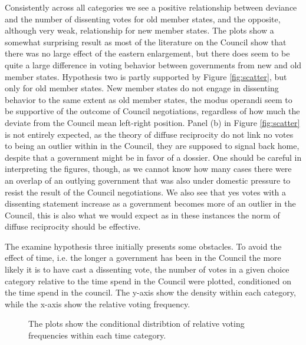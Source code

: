 Consistently across all categories we see a positive relationship between deviance and the number of dissenting votes for old member states, and the opposite, although very weak, relationship for new member states. The plots show a somewhat surprising result as most of the literature on the Council show that there was no large effect of the eastern enlargement, but there does seem to be quite a large difference in voting behavior between governments from new and old member states. Hypothesis two is partly supported by Figure \ref{fig:scatter}, but only for old member states. New member states do not engage in dissenting behavior to the same extent as old member states, the modus operandi seem to be supportive of the outcome of Council negotiations, regardless of how much the deviate from the Council mean left-right position. Panel (b) in Figure \ref{fig:scatter} is not entirely expected, as the theory of diffuse reciprocity do not link no votes to being an outlier within in the Council, they are supposed to signal back home, despite that a government might be in favor of a dossier. One should be careful in interpreting the figures, though, as we cannot know how many cases there were an overlap of an outlying government that was also under domestic pressure to resist the result of the Council negotiations. We also see that yes votes with a dissenting statement increase as a government becomes more of an outlier in the Council, this is also what we would expect as in these instances the norm of diffuse reciprocity should be effective.  

The examine hypothesis three initially presents some obstacles. To avoid the effect of time, i.e. the longer a government has been in the Council the more likely it is to have cast a dissenting vote, the number of votes in a given choice category relative to the time spend in the Council were plotted, conditioned on the time spend in the council. The y-axis show the density within each category, while the x-axis show the relative voting frequency.

 
\begin{figure}[htp]
\centering
\scalebox{.6}{\subfloat[][No Votes]{}}\quad
\scalebox{.6}{\subfloat[][Abstentions]{}}\quad
{}\quad
\caption{The plots show the conditional distribtion of relative voting frequencies within each time category.}
\label{fig:histogram}
\end{figure}

